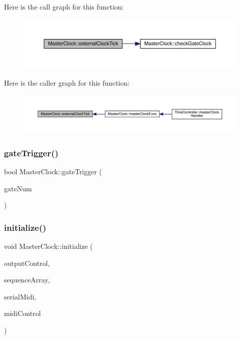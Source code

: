 Here is the call graph for this function\+:
\nopagebreak
\begin{figure}[H]
\begin{center}
\leavevmode
\includegraphics[width=350pt]{class_master_clock_ab64882eca80c7e2de0b9e57020661df9_cgraph}
\end{center}
\end{figure}
Here is the caller graph for this function\+:
\nopagebreak
\begin{figure}[H]
\begin{center}
\leavevmode
\includegraphics[width=350pt]{class_master_clock_ab64882eca80c7e2de0b9e57020661df9_icgraph}
\end{center}
\end{figure}
\mbox{\label{class_master_clock_a16c1149bcc96dbea9d57063ad7a65d17}} 
\subsubsection{\texorpdfstring{gate\+Trigger()}{gateTrigger()}}
{\footnotesize\ttfamily bool Master\+Clock\+::gate\+Trigger (\begin{DoxyParamCaption}\item[{uint8\+\_\+t}]{gate\+Num }\end{DoxyParamCaption})}

\mbox{\label{class_master_clock_aa7106b58216e1bc65dc88cdbba1d0514}} 
\subsubsection{\texorpdfstring{initialize()}{initialize()}}
{\footnotesize\ttfamily void Master\+Clock\+::initialize (\begin{DoxyParamCaption}\item[{\hyperlink{class_output_controller}{Output\+Controller} $\ast$}]{output\+Control,  }\item[{Sequencer $\ast$}]{sequence\+Array,  }\item[{midi\+::\+Midi\+Interface$<$ Hardware\+Serial $>$ $\ast$}]{serial\+Midi,  }\item[{\hyperlink{class_midi_module}{Midi\+Module} $\ast$}]{midi\+Control }\end{DoxyParamCaption})}

